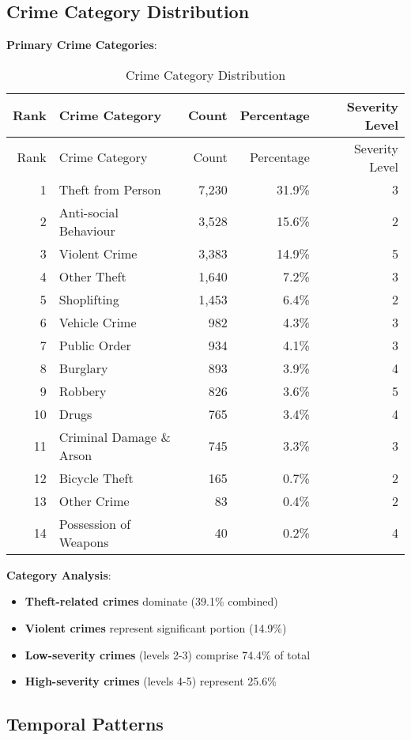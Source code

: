 \documentclass[12pt,a4paper]{article}
\begin{document}
\subsection{Crime Category Distribution}

\textbf{Primary Crime Categories}:

\begin{longtable}{@{}rlrrr@{}}
\caption{Crime Category Distribution} \\
\toprule
Rank & Crime Category & Count & Percentage & Severity Level \\
\midrule
\endfirsthead
\toprule
Rank & Crime Category & Count & Percentage & Severity Level \\
\midrule
\endhead
1 & Theft from Person & 7,230 & 31.9\% & 3 \\
2 & Anti-social Behaviour & 3,528 & 15.6\% & 2 \\
3 & Violent Crime & 3,383 & 14.9\% & 5 \\
4 & Other Theft & 1,640 & 7.2\% & 3 \\
5 & Shoplifting & 1,453 & 6.4\% & 2 \\
6 & Vehicle Crime & 982 & 4.3\% & 3 \\
7 & Public Order & 934 & 4.1\% & 3 \\
8 & Burglary & 893 & 3.9\% & 4 \\
9 & Robbery & 826 & 3.6\% & 5 \\
10 & Drugs & 765 & 3.4\% & 4 \\
11 & Criminal Damage \& Arson & 745 & 3.3\% & 3 \\
12 & Bicycle Theft & 165 & 0.7\% & 2 \\
13 & Other Crime & 83 & 0.4\% & 2 \\
14 & Possession of Weapons & 40 & 0.2\% & 4 \\
\bottomrule
\end{longtable}

\textbf{Category Analysis}:
\begin{itemize}
    \item \textbf{Theft-related crimes} dominate (39.1\% combined)
    \item \textbf{Violent crimes} represent significant portion (14.9\%)
    \item \textbf{Low-severity crimes} (levels 2-3) comprise 74.4\% of total
    \item \textbf{High-severity crimes} (levels 4-5) represent 25.6\%
\end{itemize}

\subsection{Temporal Patterns}
\end{document}

